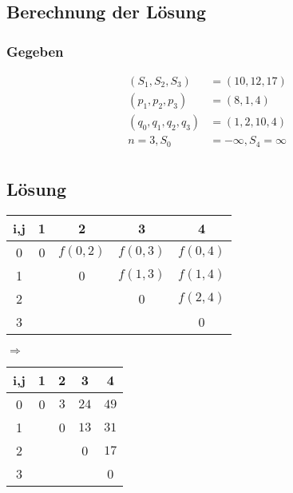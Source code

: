 \documentclass[ngerman,a4paper]{report}
\begin{document}
\subsection*{Berechnung der Lösung}
\subsubsection*{Gegeben}
\begin{align*}
(S_1,S_2,S_3) &= (10, 12, 17)\\
(p_1,p_2,p_3) &= (8, 1, 4)\\
(q_0,q_1,q_2,q_3) &= (1, 2, 10, 4)\\
n = 3, S_0 &= -\infty, S_4 = \infty\\
\end{align*}
\subsection*{Lösung}
\begin{tabular}{|c||c|c|c|c|}
\hline
i,j &1 & 2 & 3 & 4  \\
\hline
\hline
0&  0& $f(0,2)$ & $f(0,3)$ & $f(0,4)$ \\
\hline
1&  & 0 & $f(1,3)$ & $f(1,4)$  \\
\hline
2&  &  & 0 &$f(2,4)$\\
\hline
3&  &  &  & 0  \\
\hline
\end{tabular}
$\Rightarrow$
\begin{tabular}{|c||c|c|c|c|}
\hline
i,j &1 & 2 & 3 & 4  \\
\hline
\hline
0&  0& $3$ & $24$ & $49$ \\
\hline
1&  & 0 & $13$ & $31$  \\
\hline
2&  &  & 0 &$17$\\
\hline
3&  &  &  & 0  \\
\hline
\end{tabular}\\
\end{document}
